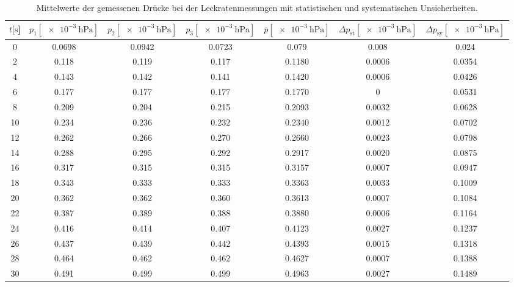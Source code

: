\begin{table}[H]
  \centering
    \caption{Mittelwerte der gemessenen Drücke bei der Leckratenmessungen mit statistischen und systematischen Unsicherheiten.}
    \label{tab:Turbo_Leck2}
    \small{
    \begin{tabular}{
      S[table-format=3.0] 
      S[table-format=1.4] S[table-format=1.4] S[table-format=1.4]
      S[table-format=1.4] S[table-format=1.4] S[table-format=1.3]
      }
      \toprule
      {$t [\si{\second}$]} &
      {$p_1 [\SI{e-3}{\hecto\pascal}]$} & {$p_2 [\SI{e-3}{\hecto\pascal}]$} & {$p_3 [\SI{e-3}{\hecto\pascal}]$} &
      {$\bar{p} [\SI{e-3}{\hecto\pascal}]$} & {$\Delta p_\text{st} [\SI{e-3}{\hecto\pascal}]$} & {$\Delta p_\text{sy} [\SI{e-3}{\hecto\pascal}]$}\\
         & 0.0698 & 0.0942 & 0.0723 & 0.079   & 0.008   & 0.024  \\
      2   & 0.118  & 0.119  & 0.117  & 0.1180  & 0.0006  & 0.0354 \\
      4   & 0.143  & 0.142  & 0.141  & 0.1420  & 0.0006  & 0.0426 \\
      6   & 0.177  & 0.177  & 0.177  & 0.1770  & 0       & 0.0531 \\
      8   & 0.209  & 0.204  & 0.215  & 0.2093  & 0.0032  & 0.0628 \\
      10  & 0.234  & 0.236  & 0.232  & 0.2340  & 0.0012  & 0.0702 \\
      12  & 0.262  & 0.266  & 0.270  & 0.2660  & 0.0023  & 0.0798 \\
      14  & 0.288  & 0.295  & 0.292  & 0.2917  & 0.0020  & 0.0875 \\
      16  & 0.317  & 0.315  & 0.315  & 0.3157  & 0.0007  & 0.0947 \\
      18  & 0.343  & 0.333  & 0.333  & 0.3363  & 0.0033  & 0.1009 \\
      20  & 0.362  & 0.362  & 0.360  & 0.3613  & 0.0007  & 0.1084 \\
      22  & 0.387  & 0.389  & 0.388  & 0.3880  & 0.0006  & 0.1164 \\
      24  & 0.416  & 0.414  & 0.407  & 0.4123  & 0.0027  & 0.1237 \\
      26  & 0.437  & 0.439  & 0.442  & 0.4393  & 0.0015  & 0.1318 \\
      28  & 0.464  & 0.462  & 0.462  & 0.4627  & 0.0007  & 0.1388 \\
      30  & 0.491  & 0.499  & 0.499  & 0.4963  & 0.0027  & 0.1489 \\

\end{tabular}}
\end{table}
